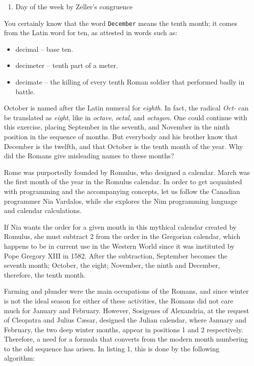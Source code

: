 \documentclass[
  12pt,
]{book}
\providecommand{\tightlist}{%
  \setlength{\itemsep}{0pt}\setlength{\parskip}{0pt}}
\begin{document}
\begin{enumerate}
\def\labelenumi{(\arabic{enumi})}
\tightlist
\item
  Day of the week by Zeller's congruence
\end{enumerate}

You certainly know that the word \texttt{December} means the tenth
month; it comes from the Latin word for ten, as attested in words such
as:

\begin{itemize}
\tightlist
\item
  decimal -- base ten.
\item
  decimeter -- tenth part of a meter.
\item
  decimate -- the killing of every tenth Roman soldier that performed
  badly in battle.
\end{itemize}

October is named after the Latin numeral for \emph{eighth}. In fact, the
radical \emph{Oct-} can be translated as \emph{eight}, like in
\emph{octave}, \emph{octal}, and \emph{octagon}. One could continue with
this exercise, placing September in the seventh, and November in the
ninth position in the sequence of months. But everybody and his brother
know that December is the twelfth, and that October is the tenth month
of the year. Why did the Romans give misleading names to these months?

Rome was purportedly founded by Romulus, who designed a calendar. March
was the first month of the year in the Romulus calendar. In order to get
acquainted with programming and the accompanying concepts, let us follow
the Canadian programmer Nia Vardalos, while she explores the Nim
programming language and calendar calculations.

If Nia wants the order for a given month in this mythical calendar
created by Romulus, she must subtract 2 from the order in the Gregorian
calendar, which happens to be in current use in the Western World since
it was instituted by Pope Gregory XIII in 1582. After the subtraction,
September becomes the seventh month; October, the eight; November, the
ninth and December, therefore, the tenth month.

Farming and plunder were the main occupations of the Romans, and since
winter is not the ideal season for either of these activities, the
Romans did not care much for January and February. However, Sosigenes of
Alexandria, at the request of Cleopatra and Julius Cæsar, designed the
Julian calendar, where January and February, the two deep winter months,
appear in positions 1 and 2 respectively. Therefore, a need for a
formula that converts from the modern month numbering to the old
sequence has arisen. In listing 1, this is done by the following
algorithm:
\end{document}
